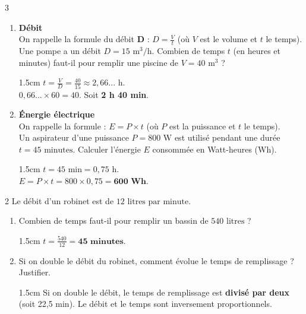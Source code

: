 \documentclass[a4paper]{book}
\begin{document}
{\begin{exerciceNote}{3}
\begin{enumerate}[leftmargin=*]
            \item \textbf{Débit} \\
            On rappelle la formule du débit \textbf{D} : $D = \frac{V}{t}$ (où $V$ est le volume et $t$ le temps). \\
            Une pompe a un débit $D = 15 \text{ m}^3\text{/h}$. Combien de temps $t$ (en heures et minutes) faut-il pour remplir une piscine de $V = 40 \text{ m}^3$ ?

            \begin{ZoneReponse}{1.5cm}                
            $t = \frac{V}{D} = \frac{40}{15} \approx 2,66... \text{ h}$. \\
            $0,66... \times 60 = 40$. Soit \textbf{2 h 40 min}.
            \end{ZoneReponse}

\newpage
            
            \item \textbf{Énergie électrique} \\
            On rappelle la formule : $E = P \times t$ (où $P$ est la puissance et $t$ le temps). \\
            Un aspirateur d'une puissance $P = 800 \text{ W}$ est utilisé pendant une durée $t = 45 \text{ minutes}$. 
            Calculer l'énergie $E$ consommée en Watt-heures (Wh).

            \begin{ZoneReponse}{1.5cm}                
            $t = 45 \text{ min} = 0,75 \text{ h}$. \\
            $E = P \times t = 800 \times 0,75 = \mathbf{600 \text{ Wh}}$.
            \end{ZoneReponse}
        \end{enumerate}
    \end{exerciceNote}


    \begin{exerciceNote}{2}
        Le débit d'un robinet est de $12 \text{ litres par minute}$.
        \begin{enumerate}[leftmargin=*]
            \item 
            Combien de temps faut-il pour remplir un bassin de $540 \text{ litres}$ ? 
            \begin{ZoneReponse}{1.5cm}                
            $t = \frac{540}{12} = \mathbf{45 \text{ minutes}}$.
            \end{ZoneReponse}

            \item Si on double le débit du robinet, comment évolue le temps de remplissage ? Justifier.
            \begin{ZoneReponse}{1.5cm}                
            Si on double le débit, le temps de remplissage est \textbf{divisé par deux} (soit 22,5 min). Le débit et le temps sont inversement proportionnels.
            \end{ZoneReponse}
        \end{enumerate}
    \end{exerciceNote}


}
\end{document}
